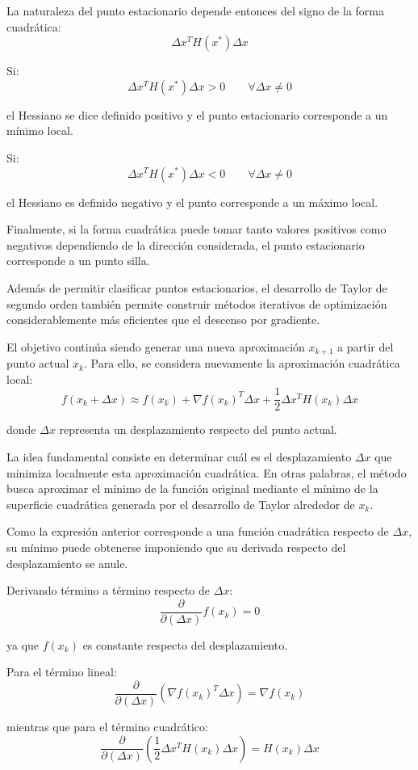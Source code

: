 La naturaleza del punto estacionario depende entonces del signo de la forma cuadrática:
\[
\Delta x^TH(x^*)\Delta x
\]

Si:
\[
\Delta x^TH(x^*)\Delta x>0
\qquad
\forall \Delta x\neq0
\]

el Hessiano se dice definido positivo y el punto estacionario corresponde a un mínimo local.

Si:
\[
\Delta x^TH(x^*)\Delta x<0
\qquad
\forall \Delta x\neq0
\]

el Hessiano es definido negativo y el punto corresponde a un máximo local.

Finalmente, si la forma cuadrática puede tomar tanto valores positivos como negativos dependiendo de la dirección considerada, el punto estacionario corresponde a un punto silla.

Además de permitir clasificar puntos estacionarios, el desarrollo de Taylor de segundo orden también permite construir métodos iterativos de optimización considerablemente más eficientes que el descenso por gradiente.

El objetivo continúa siendo generar una nueva aproximación \(x_{k+1}\) a partir del punto actual \(x_k\). Para ello, se considera nuevamente la aproximación cuadrática local:
\[
f(x_k+\Delta x)
\approx
f(x_k)
+
\nabla f(x_k)^T\Delta x
+
\frac{1}{2}\Delta x^TH(x_k)\Delta x
\]

donde \(\Delta x\) representa un desplazamiento respecto del punto actual.

La idea fundamental consiste en determinar cuál es el desplazamiento \(\Delta x\) que minimiza localmente esta aproximación cuadrática. En otras palabras, el método busca aproximar el mínimo de la función original mediante el mínimo de la superficie cuadrática generada por el desarrollo de Taylor alrededor de \(x_k\).

Como la expresión anterior corresponde a una función cuadrática respecto de \(\Delta x\), su mínimo puede obtenerse imponiendo que su derivada respecto del desplazamiento se anule.

Derivando término a término respecto de \(\Delta x\):
\[
\frac{\partial}{\partial (\Delta x)}
f(x_k)
=
0
\]

ya que \(f(x_k)\) es constante respecto del desplazamiento.

Para el término lineal:
\[
\frac{\partial}{\partial (\Delta x)}
\left(
\nabla f(x_k)^T\Delta x
\right)
=
\nabla f(x_k)
\]

mientras que para el término cuadrático:
\[
\frac{\partial}{\partial (\Delta x)}
\left(
\frac{1}{2}\Delta x^TH(x_k)\Delta x
\right)
=
H(x_k)\Delta x
\]


